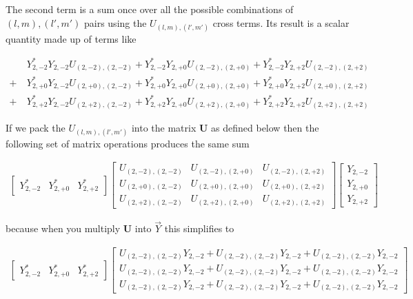 \documentclass[paper=a4, fontsize=11pt]{scrartcl} %
\numberwithin{equation}{section} %
\numberwithin{figure}{section} %
\numberwithin{table}{section} %
\begin{document}
The second term is a sum once over all the possible combinations of $(l,m), (l',m')$ pairs using the $U_{(l,m),(l',m')}$ cross terms. Its result is a scalar quantity made up of terms like

\begin{align}
&Y_{2,-2}^{*}Y_{2,-2}U_{(2,-2),(2,-2)} + Y_{2,-2}^{*}Y_{2,+0}U_{(2,-2),(2,+0)} + Y_{2,-2}^{*}Y_{2,+2}U_{(2,-2),(2,+2)} \\ 
 +  \ &Y_{2,+0}^{*}Y_{2,-2}U_{(2,+0),(2,-2)} + Y_{2,+0}^{*}Y_{2,+0}U_{(2,+0),(2,+0)} + Y_{2,+0}^{*}Y_{2,+2}U_{(2,+0),(2,+2)} \\ 
+ \  &Y_{2,+2}^{*}Y_{2,-2}U_{(2,+2),(2,-2)} + Y_{2,+2}^{*}Y_{2,+0}U_{(2,+2),(2,+0)} + Y_{2,+2}^{*}Y_{2,+2}U_{(2,+2),(2,+2)}
\end{align}


If we pack the $U_{(l,m),(l',m')}$ into the matrix $\mathbf{U}$ as defined below then the following set of matrix operations produces the same sum

\begin{align*}
\begin{bmatrix}
Y_{2,-2}^{*} &Y_{2,+0}^{*}  &Y_{2,+2}^{*}   
\end{bmatrix}
\begin{bmatrix}
U_{(2,-2),(2,-2)} &  U_{(2,-2),(2,+0)} &  U_{(2,-2),(2,+2)} \\
U_{(2,+0),(2,-2)} &  U_{(2,+0),(2,+0)} &  U_{(2,+0),(2,+2)} \\
U_{(2,+2),(2,-2)} &  U_{(2,+2),(2,+0)} &  U_{(2,+2),(2,+2)}
\end{bmatrix}
\begin{bmatrix}
Y_{2,-2} \\
Y_{2,+0} \\
Y_{2,+2}
\end{bmatrix}
\end{align*}

because when you multiply $\mathbf{U}$ into $\vec{Y}$ this simplifies to 



\begin{align*}
\begin{bmatrix}
Y_{2,-2}^{*} &Y_{2,+0}^{*}  &Y_{2,+2}^{*}   
\end{bmatrix}
\begin{bmatrix}
U_{(2,-2),(2,-2)} Y_{2,-2} + U_{(2,-2),(2,-2)}Y_{2,-2} + U_{(2,-2),(2,-2)}Y_{2,-2} \\ 
U_{(2,-2),(2,-2)} Y_{2,-2} + U_{(2,-2),(2,-2)}Y_{2,-2} + U_{(2,-2),(2,-2)}Y_{2,-2} \\ 
U_{(2,-2),(2,-2)} Y_{2,-2} + U_{(2,-2),(2,-2)}Y_{2,-2} + U_{(2,-2),(2,-2)}Y_{2,-2} 
\end{bmatrix}
\end{align*}
\end{document}
